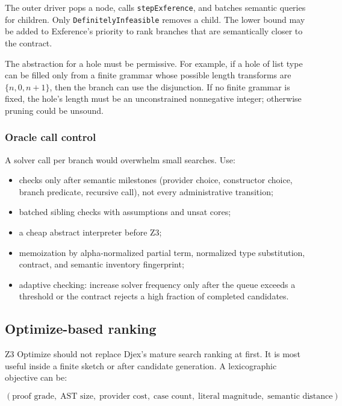 \documentclass[11pt,oneside]{article}
\newcommand{\code}[1]{\texttt{#1}}
\begin{document}
The outer driver pops a node, calls \code{stepExference}, and batches semantic queries
for children. Only \code{DefinitelyInfeasible} removes a child. The lower bound may be
added to Exference's priority to rank branches that are semantically closer to the
contract.

The abstraction for a hole must be permissive. For example, if a hole of list type can
be filled only from a finite grammar whose possible length transforms are
$\{n,0,n+1\}$, then the branch can use the disjunction. If no finite grammar is fixed,
the hole's length must be an unconstrained nonnegative integer; otherwise pruning could
be unsound.

\subsubsection{Oracle call control}

A solver call per branch would overwhelm small searches. Use:

\begin{itemize}
  \item checks only after semantic milestones (provider choice, constructor choice,
        branch predicate, recursive call), not every administrative transition;
  \item batched sibling checks with assumptions and unsat cores;
  \item a cheap abstract interpreter before Z3;
  \item memoization by alpha-normalized partial term, normalized type substitution,
        contract, and semantic inventory fingerprint;
  \item adaptive checking: increase solver frequency only after the queue exceeds a
        threshold or the contract rejects a high fraction of completed candidates.
\end{itemize}

\subsection{Optimize-based ranking}

Z3 Optimize should not replace Djex's mature search ranking at first. It is most useful
inside a finite sketch or after candidate generation. A lexicographic objective can be:

\[
  (\text{proof grade},\;\text{AST size},\;\text{provider cost},\;
   \text{case count},\;\text{literal magnitude},\;\text{semantic distance}).
\]
\end{document}
